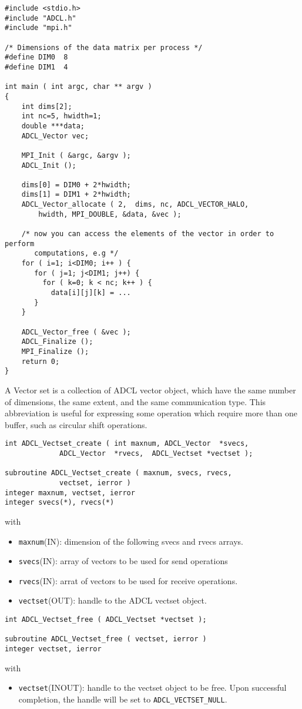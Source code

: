 \begin{verbatim}
#include <stdio.h>
#include "ADCL.h"
#include "mpi.h"

/* Dimensions of the data matrix per process */
#define DIM0  8
#define DIM1  4

int main ( int argc, char ** argv ) 
{
    int dims[2];
    int nc=5, hwidth=1;
    double ***data;
    ADCL_Vector vec;
    
    MPI_Init ( &argc, &argv );
    ADCL_Init ();
    
    dims[0] = DIM0 + 2*hwidth;
    dims[1] = DIM1 + 2*hwidth;
    ADCL_Vector_allocate ( 2,  dims, nc, ADCL_VECTOR_HALO, 
        hwidth, MPI_DOUBLE, &data, &vec );
    
    /* now you can access the elements of the vector in order to perform 
       computations, e.g */
    for ( i=1; i<DIM0; i++ ) {
       for ( j=1; j<DIM1; j++) {
         for ( k=0; k < nc; k++ ) {
           data[i][j][k] = ...
       }
    }
    
    ADCL_Vector_free ( &vec );        
    ADCL_Finalize ();
    MPI_Finalize ();
    return 0;
}
\end{verbatim}

A Vector set is a collection of ADCL vector object, which have the same number
of dimensions, the same extent, and the same communication type. This
abbreviation is useful for expressing some operation which require more than
one buffer, such as circular shift operations.

\begin{verbatim}
int ADCL_Vectset_create ( int maxnum, ADCL_Vector  *svecs,
             ADCL_Vector  *rvecs,  ADCL_Vectset *vectset );

subroutine ADCL_Vectset_create ( maxnum, svecs, rvecs, 
             vectset, ierror )
integer maxnum, vectset, ierror
integer svecs(*), rvecs(*)
\end{verbatim}
with
\begin{itemize}
\item {\tt maxnum}(IN): dimension of the following svecs and rvecs arrays.
\item {\tt svecs}(IN): array of vectors to be used for send operations
\item {\tt rvecs}(IN): arrat of vectors to be used for receive operations.
\item {\tt vectset}(OUT):  handle to the ADCL vectset object.
\end{itemize}

\begin{verbatim}
int ADCL_Vectset_free ( ADCL_Vectset *vectset );

subroutine ADCL_Vectset_free ( vectset, ierror )
integer vectset, ierror
\end{verbatim}
with
\begin{itemize}
\item {\tt vectset}(INOUT): handle to the vectset object to be free. Upon
  successful completion, the handle will be set to {\tt ADCL\_VECTSET\_NULL}.
\end{itemize}

